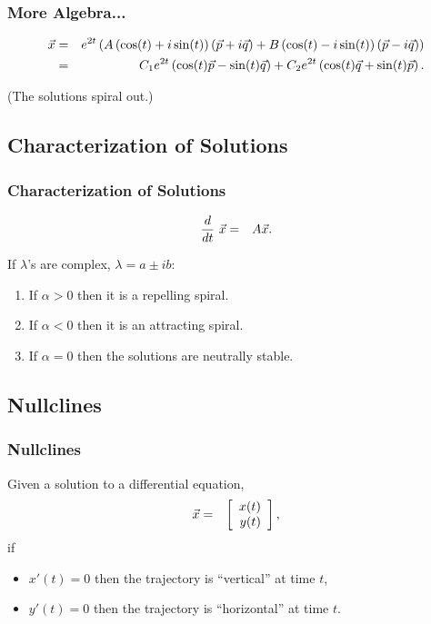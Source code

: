 \begin{frame}
  \frametitle{More Algebra...}

  \begin{eqnarray*}
    \vec{x} & = & e^{2t} \lp
      A\lp \cos(t) + i \sin(t) \rp \lp \vec{p} + i \vec{q} \rp 
      + B \lp \cos(t) - i \sin(t) \rp \lp \vec{p} - i \vec{q} \rp 
      \rp \\
      & = & C_1 e^{2t} \lp \cos(t) \vec{p} - \sin(t) \vec{q} \rp
      + C_2 e^{2t} \lp \cos(t) \vec{q} + \sin(t) \vec{p} \rp.
  \end{eqnarray*}

  (The solutions spiral out.)

\end{frame}

\subsection{Characterization of Solutions}

\begin{frame}
  \frametitle{Characterization of Solutions}

  \begin{eqnarray*}
    \deriv{~}{t} \vec{x} & = & A \vec{x}.
  \end{eqnarray*}

  If $\lambda$'s are complex, $\lambda = a \pm ib$:
  \begin{enumerate}
  \item If $\alpha>0$ then it is a repelling spiral.
  \item If $\alpha<0$ then it is an attracting spiral.
  \item If $\alpha=0$ then the solutions are neutrally stable.
  \end{enumerate}

\end{frame}


\subsection{Nullclines}

\begin{frame}
  \frametitle{Nullclines}

  Given a solution to a differential equation,
  \begin{eqnarray*}
    \vec{x} & = & \vecTwo{x(t)}{y(t)},
  \end{eqnarray*}
  if
  \begin{itemize}
  \item $x'(t)=0$ then the trajectory is ``vertical'' at time $t$,
  \item $y'(t)=0$ then the trajectory is ``horizontal'' at time $t$.
  \end{itemize}

\end{frame}


